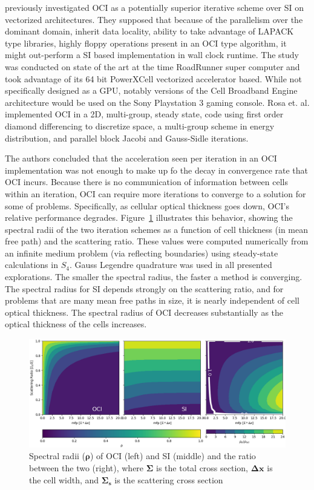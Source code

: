 \cite{rosa_cellwise_2013} previously investigated OCI as a potentially superior iterative scheme over SI on vectorized architectures.
They supposed that because of the parallelism over the dominant domain, inherit data locality, ability to take advantage of LAPACK type libraries, highly floppy operations present in an OCI type algorithm, it might out-perform a SI based implementation in wall clock runtime.
The study was conducted on state of the art at the time RoadRunner super computer and took advantage of its 64 bit PowerXCell vectorized accelerator based.
While not specifically designed as a GPU, notably versions of the Cell Broadband Engine architecture would be used on the Sony Playstation 3 gaming console.
Rosa et. al. implemented OCI in a 2D, multi-group, steady state, code using first order diamond differencing to discretize space, a multi-group scheme in energy distribution, and parallel block Jacobi and Gauss-Sidle iterations.

The authors concluded that the acceleration seen per iteration in an OCI implementation was not enough to make up fo the decay in convergence rate that OCI incurs.
Because there is no communication of information between cells within an iteration, OCI can require more iterations to converge to a solution for some of problems. 
Specifically, as cellular optical thickness goes down, OCI's relative performance degrades.
Figure~\ref{fig:specrad} illustrates this behavior, showing the spectral radii of the two iteration schemes as a function of cell thickness (in mean free path) and the scattering ratio.
These values were computed numerically from an infinite medium problem (via reflecting boundaries) using steady-state calculations in $S_4$. 
Gauss Legendre quadrature was used in all presented explorations.
The smaller the spectral radius, the faster a method is converging.
The spectral radius for SI depends strongly on the scattering ratio, and for problems that are many mean free paths in size, it is nearly independent of cell optical thickness. 
The spectral radius of OCI decreases substantially as the optical thickness of the cells increases.

\begin{figure}[!htb]
    \centering
    \includegraphics[width=\textwidth]{figures/spec_rad.png}
    \caption{Spectral radii ($\boldsymbol{\rho}$) of OCI (left) and SI (middle) and the ratio between the two (right), where $\boldsymbol{\Sigma}$ is the total cross section, $\boldsymbol{\Delta x}$ is the cell width, and $\boldsymbol{\Sigma_s}$ is the scattering cross section}
    \label{fig:specrad}
  \end{figure}

